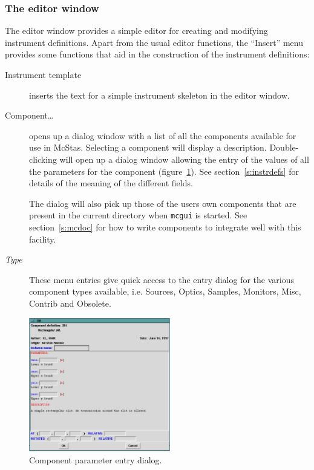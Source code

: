 \subsubsection{The editor window}

The editor window provides a simple editor for creating and modifying
instrument definitions. Apart from the usual editor functions, the
``Insert'' menu provides some functions that aid in the construction of
the instrument definitions:
\begin{description}
\item[Instrument template] inserts the text for a simple instrument
  skeleton in the editor window.
\item[Component\ldots] opens up a dialog window with a list of all
  the components available for use in McStas. Selecting a component will
  display a description. Double-clicking will open up a dialog window
  allowing the entry of the values of all the parameters for the
  component (figure~\ref{f:comp_dialog}). See section~\ref{s:instrdefs}
  for details of the meaning of the different fields.

The dialog will also pick up those of the users own components that are
  present in the current directory when \verb+mcgui+ is started. See
  section~\ref{s:mcdoc} for how to write components to integrate well
  with this facility.
\item[\textit{Type}] These menu entries give quick access to the entry
  dialog for the various component types available, i.e. Sources,
  Optics, Samples, Monitors, Misc, Contrib and Obsolete.
\end{description}
\begin{figure}[tbp]
  \begin{center}
    \includegraphics[width=0.55\textwidth]{figures/comp_dialog.eps}
    \caption{Component parameter entry dialog.}
    \label{f:comp_dialog}
  \end{center}
\end{figure}

